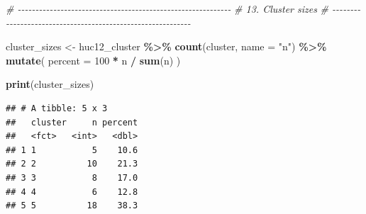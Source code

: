\documentclass[
]{article}
\newenvironment{Shaded}{\begin{snugshade}}{\end{snugshade}}
\newcommand{\AttributeTok}[1]{\textcolor[rgb]{0.13,0.29,0.53}{#1}}
\newcommand{\CommentTok}[1]{\textcolor[rgb]{0.56,0.35,0.01}{\textit{#1}}}
\newcommand{\DecValTok}[1]{\textcolor[rgb]{0.00,0.00,0.81}{#1}}
\newcommand{\FunctionTok}[1]{\textcolor[rgb]{0.13,0.29,0.53}{\textbf{#1}}}
\newcommand{\NormalTok}[1]{#1}
\newcommand{\OtherTok}[1]{\textcolor[rgb]{0.56,0.35,0.01}{#1}}
\newcommand{\SpecialCharTok}[1]{\textcolor[rgb]{0.81,0.36,0.00}{\textbf{#1}}}
\newcommand{\StringTok}[1]{\textcolor[rgb]{0.31,0.60,0.02}{#1}}
\begin{document}
\begin{Shaded}
\begin{Highlighting}[]
\CommentTok{\# {-}{-}{-}{-}{-}{-}{-}{-}{-}{-}{-}{-}{-}{-}{-}{-}{-}{-}{-}{-}{-}{-}{-}{-}{-}{-}{-}{-}{-}{-}{-}{-}{-}{-}{-}{-}{-}{-}{-}{-}{-}{-}{-}{-}{-}{-}{-}{-}{-}{-}{-}{-}{-}{-}{-}{-}{-}{-}{-}{-}}
\CommentTok{\# 13. Cluster sizes}
\CommentTok{\# {-}{-}{-}{-}{-}{-}{-}{-}{-}{-}{-}{-}{-}{-}{-}{-}{-}{-}{-}{-}{-}{-}{-}{-}{-}{-}{-}{-}{-}{-}{-}{-}{-}{-}{-}{-}{-}{-}{-}{-}{-}{-}{-}{-}{-}{-}{-}{-}{-}{-}{-}{-}{-}{-}{-}{-}{-}{-}{-}{-}}

\NormalTok{cluster\_sizes }\OtherTok{\textless{}{-}}\NormalTok{ huc12\_cluster }\SpecialCharTok{\%\textgreater{}\%}
  \FunctionTok{count}\NormalTok{(cluster, }\AttributeTok{name =} \StringTok{"n"}\NormalTok{) }\SpecialCharTok{\%\textgreater{}\%}
  \FunctionTok{mutate}\NormalTok{(}
    \AttributeTok{percent =} \DecValTok{100} \SpecialCharTok{*}\NormalTok{ n }\SpecialCharTok{/} \FunctionTok{sum}\NormalTok{(n)}
\NormalTok{  )}

\FunctionTok{print}\NormalTok{(cluster\_sizes)}
\end{Highlighting}
\end{Shaded}

\begin{verbatim}
## # A tibble: 5 x 3
##   cluster     n percent
##   <fct>   <int>   <dbl>
## 1 1           5    10.6
## 2 2          10    21.3
## 3 3           8    17.0
## 4 4           6    12.8
## 5 5          18    38.3
\end{verbatim}
\end{document}
